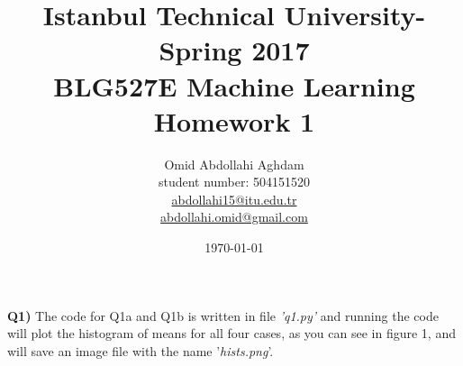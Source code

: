 \documentclass[12pt]{article}
\begin{document}
\title{Istanbul Technical University- Spring 2017 \\ BLG527E Machine Learning \\ Homework 1}
\author{Omid Abdollahi Aghdam \\
student number: 504151520\\
\href{mailto:abdollahi15@itu.edu.tr}{abdollahi15@itu.edu.tr}\\
\href{mailto:abdollahi.omid@gmail.com}{abdollahi.omid@gmail.com}
}
\date{\today}
\maketitle
\newpage
\textbf{Q1)} The code for Q1a and Q1b is written in file \textit{'q1.py'} and running the code will plot the histogram of means for all four cases, as you can see in figure 1, and will save an image file with the name '\textit{hists.png}'.\\
\end{document}
